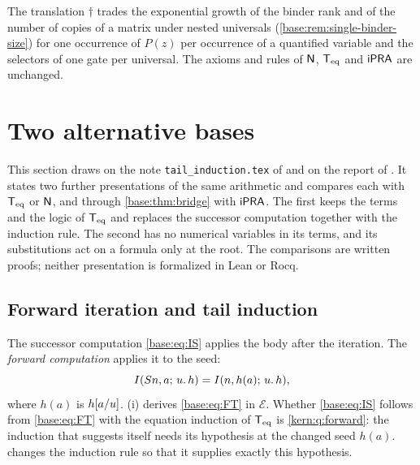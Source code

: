 The translation $\dagger$ trades the exponential growth of the binder rank
and of the number of copies of a matrix under nested universals
(\cref{base:rem:single-binder-size}) for one occurrence of $P(z)$ per
occurrence of a quantified variable and the selectors of one gate per
universal.  The axioms and rules of $\mathsf{N}$, $\mathsf{T}_{\mathrm{eq}}$
and $\mathsf{iPRA}$ are unchanged.

\section{Two alternative bases}
\label{base:sec:alt}

This section draws on the note \texttt{tail\_induction.tex} of
 and on the report of .  It states
two further presentations of the same arithmetic and compares each with
$\mathsf{T}_{\mathrm{eq}}$ or $\mathsf{N}$, and through \cref{base:thm:bridge} with $\mathsf{iPRA}$.  The
first keeps the terms and the logic of $\mathsf{T}_{\mathrm{eq}}$ and replaces the successor
computation together with the induction rule.  The second has no numerical
variables in its terms, and its substitutions act on a formula only at the
root.  The comparisons are written proofs; neither presentation is
formalized in Lean or Rocq.

\subsection{Forward iteration and tail induction}
\label{base:sec:tail}

The successor computation \eqref{base:eq:IS} applies the body after the
iteration.  The \emph{forward computation} applies it to the seed:
\begin{equation}
 I(S n,a;\,u.\,h)=I(n,h(a);\,u.\,h), \label{base:eq:FT}
\end{equation}
where $h(a)$ is $h[a/u]$.  (i) derives
\eqref{base:eq:FT} in $\mathcal E$.  Whether \eqref{base:eq:IS} follows from
\eqref{base:eq:FT} with the equation induction of $\mathsf{T}_{\mathrm{eq}}$ is
\cref{kern:q:forward}: the induction that suggests itself needs its
hypothesis at the changed seed $h(a)$.   changes the
induction rule so that it supplies exactly this hypothesis.

